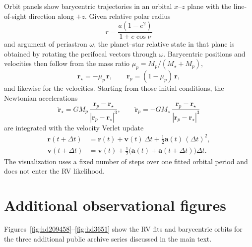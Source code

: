 \documentclass[11pt]{article}
\begin{document}
Orbit panels show barycentric trajectories in an orbital $x$--$z$ plane with
the line-of-sight direction along $+z$. Given relative polar radius
\begin{equation}
r = \frac{a(1-e^2)}{1+e\cos\nu}
\end{equation}
and argument of periastron $\omega$, the planet--star relative state in that
plane is obtained by rotating the perifocal vectors through $\omega$.
Barycentric positions and velocities then follow from the mass ratio
$\mu_p = M_p/(M_\star+M_p)$,
\begin{equation}
\mathbf{r}_\star = -\mu_p\,\mathbf{r},\qquad
\mathbf{r}_p = (1-\mu_p)\,\mathbf{r},
\end{equation}
and likewise for the velocities. Starting from those initial conditions, the
Newtonian accelerations
\begin{equation}
\ddot{\mathbf{r}}_\star
=
G M_p\,\frac{\mathbf{r}_p-\mathbf{r}_\star}{|\mathbf{r}_p-\mathbf{r}_\star|^3},
\qquad
\ddot{\mathbf{r}}_p
=
-G M_\star\,\frac{\mathbf{r}_p-\mathbf{r}_\star}{|\mathbf{r}_p-\mathbf{r}_\star|^3}
\end{equation}
are integrated with the velocity Verlet update
\begin{equation}
\begin{aligned}
\mathbf{r}(t+\Delta t)
&=
\mathbf{r}(t)+\mathbf{v}(t)\,\Delta t+\tfrac12\mathbf{a}(t)\,(\Delta t)^2,\\
\mathbf{v}(t+\Delta t)
&=
\mathbf{v}(t)+\tfrac12\bigl(\mathbf{a}(t)+\mathbf{a}(t+\Delta t)\bigr)\Delta t.
\end{aligned}
\end{equation}
The visualization uses a fixed number of steps over one fitted orbital period
and does not enter the RV likelihood.

\section{Additional observational figures}
\label{app:figures}

Figures~\ref{fig:hd209458}--\ref{fig:hd3651} show the RV fits and barycentric
orbits for the three additional public archive series discussed in the main
text.


\end{document}
